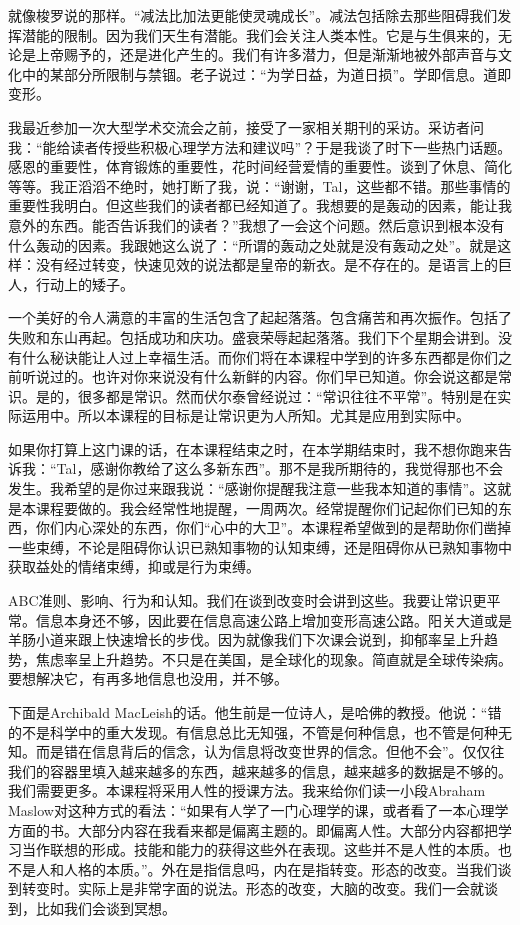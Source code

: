 就像梭罗说的那样。“减法比加法更能使灵魂成长”。减法包括除去那些阻碍我们发挥潜能的限制。因为我们天生有潜能。我们会关注人类本性。它是与生俱来的，无论是上帝赐予的，还是进化产生的。我们有许多潜力，但是渐渐地被外部声音与文化中的某部分所限制与禁锢。老子说过：“为学日益，为道日损”。学即信息。道即变形。 

我最近参加一次大型学术交流会之前，接受了一家相关期刊的采访。采访者问我：“能给读者传授些积极心理学方法和建议吗”？于是我谈了时下一些热门话题。感恩的重要性，体育锻炼的重要性，花时间经营爱情的重要性。谈到了休息、简化等等。我正滔滔不绝时，她打断了我，说：“谢谢，Tal，这些都不错。那些事情的重要性我明白。但这些我们的读者都已经知道了。我想要的是轰动的因素，能让我意外的东西。能否告诉我们的读者？”我想了一会这个问题。然后意识到根本没有什么轰动的因素。我跟她这么说了：“所谓的轰动之处就是没有轰动之处”。就是这样：没有经过转变，快速见效的说法都是皇帝的新衣。是不存在的。是语言上的巨人，行动上的矮子。

一个美好的令人满意的丰富的生活包含了起起落落。包含痛苦和再次振作。包括了失败和东山再起。包括成功和庆功。盛衰荣辱起起落落。我们下个星期会讲到。没有什么秘诀能让人过上幸福生活。而你们将在本课程中学到的许多东西都是你们之前听说过的。也许对你来说没有什么新鲜的内容。你们早已知道。你会说这都是常识。是的，很多都是常识。然而伏尔泰曾经说过：“常识往往不平常”。特别是在实际运用中。所以本课程的目标是让常识更为人所知。尤其是应用到实际中。

如果你打算上这门课的话，在本课程结束之时，在本学期结束时，我不想你跑来告诉我：“Tal，感谢你教给了这么多新东西”。那不是我所期待的，我觉得那也不会发生。我希望的是你过来跟我说：“感谢你提醒我注意一些我本知道的事情”。这就是本课程要做的。我会经常性地提醒，一周两次。经常提醒你们记起你们已知的东西，你们内心深处的东西，你们“心中的大卫”。本课程希望做到的是帮助你们凿掉一些束缚，不论是阻碍你认识已熟知事物的认知束缚，还是阻碍你从已熟知事物中获取益处的情绪束缚，抑或是行为束缚。

ABC准则、影响、行为和认知。我们在谈到改变时会讲到这些。我要让常识更平常。信息本身还不够，因此要在信息高速公路上增加变形高速公路。阳关大道或是羊肠小道来跟上快速增长的步伐。因为就像我们下次课会说到，抑郁率呈上升趋势，焦虑率呈上升趋势。不只是在美国，是全球化的现象。简直就是全球传染病。要想解决它，有再多地信息也没用，并不够。 

下面是Archibald MacLeish的话。他生前是一位诗人，是哈佛的教授。他说：“错的不是科学中的重大发现。有信息总比无知强，不管是何种信息，也不管是何种无知。而是错在信息背后的信念，认为信息将改变世界的信念。但他不会”。仅仅往我们的容器里填入越来越多的东西，越来越多的信息，越来越多的数据是不够的。我们需要更多。本课程将采用人性的授课方法。我来给你们读一小段Abraham Maslow对这种方式的看法：“如果有人学了一门心理学的课，或者看了一本心理学方面的书。大部分内容在我看来都是偏离主题的。即偏离人性。大部分内容都把学习当作联想的形成。技能和能力的获得这些外在表现。这些并不是人性的本质。也不是人和人格的本质。”。外在是指信息吗，内在是指转变。形态的改变。当我们谈到转变时。实际上是非常字面的说法。形态的改变，大脑的改变。我们一会就谈到，比如我们会谈到冥想。 

